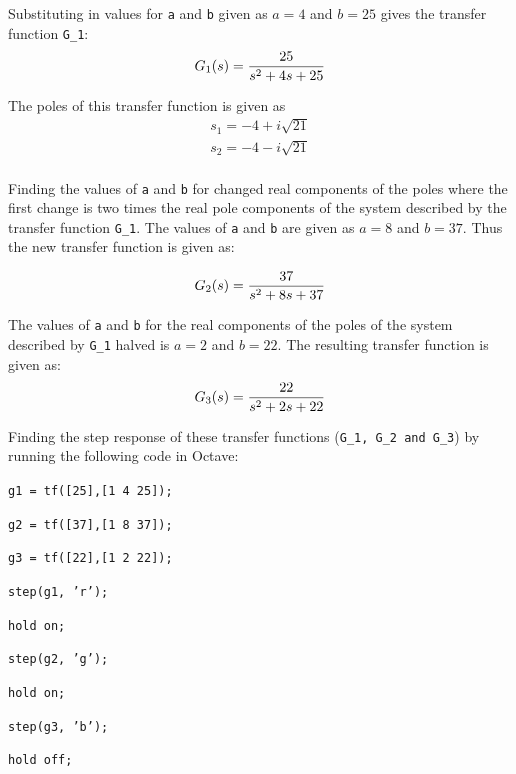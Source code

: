 \documentclass[a4paper, 12pt]{article}
\begin{document}
		Substituting in values for \texttt{a} and \texttt{b} given as $a = 4$ and $b = 25$ gives the transfer function \texttt{G\_1}:
		\begin{equation}
			G_1(s) = \frac{25}{s^2+4s+25}\\
		\end{equation}

		The poles of this transfer function is given as 
		\begin{equation}
			\begin{array}{rcl}
				s_1 = -4 + i\sqrt{21}\\
				s_2 = -4 - i\sqrt{21}\\
			\end{array}
		\end{equation}

		Finding the values of \texttt{a} and \texttt{b} for changed real components of the poles where the first change is two times the real pole components of the system described by the transfer function \texttt{G\_1}. The values of \texttt{a} and \texttt{b} are given as $a = 8$ and $b = 37$. Thus the new transfer function is given as:

		\begin{equation}
			G_2(s) = \frac{37}{s^2+8s+37}\\
		\end{equation}

		The values of \texttt{a} and \texttt{b} for the real components of the poles of the system described by \texttt{G\_1} halved is $a = 2$ and $b = 22$. The resulting transfer function is given as:
		\begin{equation}
			G_3(s) = \frac{22}{s^2+2s+22}\\
		\end{equation}

		Finding the step response of these transfer functions (\texttt{G\_1, G\_2 and G\_3}) by running the following code in Octave:

		\texttt{g1 = tf([25],[1 4 25]);}\par
		\texttt{g2 = tf([37],[1 8 37]);}\par
		\texttt{g3 = tf([22],[1 2 22]);}\par

		\texttt{step(g1, 'r');}\par
		\texttt{hold on;}\par
		\texttt{step(g2, 'g');}\par
		\texttt{hold on;}\par
		\texttt{step(g3, 'b');}\par
		\texttt{hold off;}\par
\end{document}
